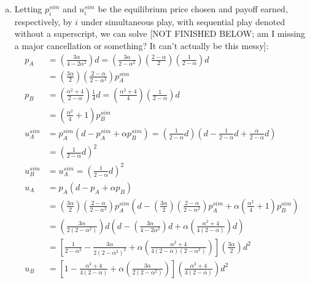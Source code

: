 \documentclass{article}
\begin{document}
\begin{enumerate}[(a)]
	
	\item Letting $p_i^{sim}$ and $u_i^{sim}$ be the equilibrium price chosen and payoff earned, respectively, by $i$ under simultaneous play, with sequential play denoted without a superscript, we can solve [NOT FINISHED BELOW; am I missing a major cancellation or something? It can't actually be this messy]:
		\begin{align*}
			p_A	&= \left(\frac{3\alpha}{4-2\alpha^2}\right)d = \left(\frac{3\alpha}{2-\alpha^2}\right)\left(\frac{2-\alpha}{2}\right)\left(\frac{1}{2-\alpha}\right)d	\\
				&= \left(\frac{3\alpha}{2}\right)\left(\frac{2-\alpha}{2-\alpha^2}\right)p_A^{sim}		\\
			p_B	&= \left(\frac{\alpha^2 + 4}{2-\alpha}\right)\frac{1}{4}d  = \left(\frac{\alpha^2 + 4}{4}\right)\left(\frac{1}{2-\alpha}\right)d	\\
				&= \left(\frac{\alpha^2}{4} + 1\right)p_B^{sim}	\\
			u_A^{sim} 	&= p_A^{sim}\left(d-p_A^{sim} + \alpha p_B^{sim}\right) = \left(\frac{1}{2-\alpha}d\right)\left(d - \frac{1}{2-\alpha}d + \frac{\alpha}{2-\alpha}d\right)	\\
						&=  \left(\frac{1}{2-\alpha}d\right)^2	\\
			u_B^{sim} 	&= u_A^{sim} = \left(\frac{1}{2-\alpha}d\right)^2	\\
			u_A	&= p_A\left(d-p_A + \alpha p_B\right) 	\\
				&= \left(\frac{3\alpha}{2}\right)\left(\frac{2-\alpha}{2-\alpha^2}\right)p_A^{sim}\left(d-\left(\frac{3\alpha}{2}\right)\left(\frac{2-\alpha}{2-\alpha^2}\right)p_A^{sim} + \alpha \left(\frac{\alpha^2}{4} + 1\right)p_B^{sim}\right) \\
				&= \left(\frac{3\alpha}{2(2-\alpha^2)}\right)d\left(d-\left(\frac{3\alpha}{4-2\alpha^2}\right)d + \alpha \left(\frac{\alpha^2 + 4}{4(2-\alpha)}\right)d\right)	\\
				&= \left[\frac{1}{2-\alpha^2}-\frac{3\alpha}{2(2-\alpha^2)^2}+\alpha\left(\frac{\alpha^2 + 4}{4(2-\alpha)(2-\alpha^2)}\right)\right]\left(\frac{3\alpha}{2}\right)d^2	\\
			u_B &= \left[1-\frac{\alpha^2+4}{4(2-\alpha)} + \alpha\left(\frac{3\alpha}{2(2-\alpha^2)}\right)\right]\left(\frac{\alpha^2+4}{4(2-\alpha)}\right)d^2
		\end{align*}
	
	
\end{enumerate}


\end{document}
